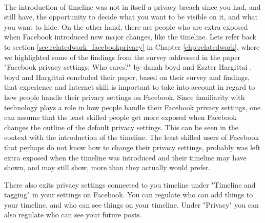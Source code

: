 \paragraph{}
The introduction of timeline was not in itself a privacy breach since you had, and still have, the opportunity to decide what you want to be visible on it, and what you want to hide. On the other hand, there are people who are extra exposed when Facebook introduced new major changes, like the timeline. Lets refer back to section \ref{sec:relatedwork_facebookprivacy} in Chapter \ref{chp:relatedwork}, where we highlighted some of the findings from the survey addressed in the paper "Facebook privacy settings; Who cares?" by danah boyd and Eszter Hargittai \cite{whocares}. boyd and Hargittai concluded their paper, based on their survey and findings, that experience and Internet skill is important to take into account in regard to how people handle their privacy settings on Facebook. Since familiarity with technology plays a role in how people handle their Facebook privacy settings, one can assume that the least skilled people get more exposed when Facebook changes the outline of the default privacy settings. 
This can be seen in the context with the introduction of the timeline. The least skilled users of Facebook that perhaps do not know how to change their privacy settings, probably was left extra exposed when the timeline was introduced and their timeline may have shown, and may still show, more than they actually would prefer. 

There also exits privacy settings connected to you timeline under "Timeline and tagging" in your settings on Facebook. You can regulate who can add things to your timeline, and who can see things on your timeline. Under "Privacy" you can also regulate who can see your future posts. 

